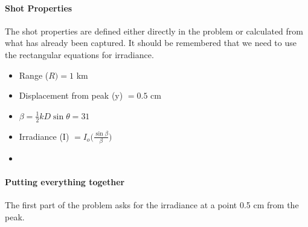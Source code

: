 \documentclass[]{article}
\begin{document}
\paragraph{Shot Properties}
The shot properties are defined either directly in the problem or calculated from what has already been captured.  It should be remembered that we need to use the rectangular equations for irradiance.
\begin{itemize}
\item Range ($R) = 1 $ km
\item Displacement from peak (y) $= 0.5$ cm
\item $\beta = \frac{1}{2} kD \sin{\theta} = 31$
\item Irradiance (I) $ = I_{o} \big( \frac{\sin{\beta}}{\beta} \big) $
\item 
\end{itemize}

\paragraph{Putting everything together}
The first part of the problem asks for the irradiance at a point 0.5 cm from the peak.
\end{document}
